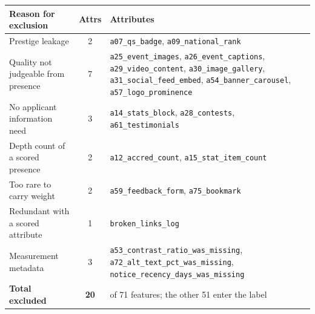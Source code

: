 \begin{tabular}{p{4.4cm}cp{8.9cm}}
\toprule
\textbf{Reason for exclusion} & \textbf{Attrs} & \textbf{Attributes} \\
\midrule
Prestige leakage & 2 & \small \texttt{a07\_qs\_badge}, \texttt{a09\_national\_rank} \\[2pt]
Quality not judgeable from presence & 7 & \small \texttt{a25\_event\_images}, \texttt{a26\_event\_captions}, \texttt{a29\_video\_content}, \texttt{a30\_image\_gallery}, \texttt{a31\_social\_feed\_embed}, \texttt{a54\_banner\_carousel}, \texttt{a57\_logo\_prominence} \\[2pt]
No applicant information need & 3 & \small \texttt{a14\_stats\_block}, \texttt{a28\_contests}, \texttt{a61\_testimonials} \\[2pt]
Depth count of a scored presence & 2 & \small \texttt{a12\_accred\_count}, \texttt{a15\_stat\_item\_count} \\[2pt]
Too rare to carry weight & 2 & \small \texttt{a59\_feedback\_form}, \texttt{a75\_bookmark} \\[2pt]
Redundant with a scored attribute & 1 & \small \texttt{broken\_links\_log} \\[2pt]
Measurement metadata & 3 & \small \texttt{a53\_contrast\_ratio\_was\_missing}, \texttt{a72\_alt\_text\_pct\_was\_missing}, \texttt{notice\_recency\_days\_was\_missing} \\[2pt]
\midrule
\textbf{Total excluded} & \textbf{20} & \small of 71 features; the other 51 enter the label \\
\bottomrule
\end{tabular}
